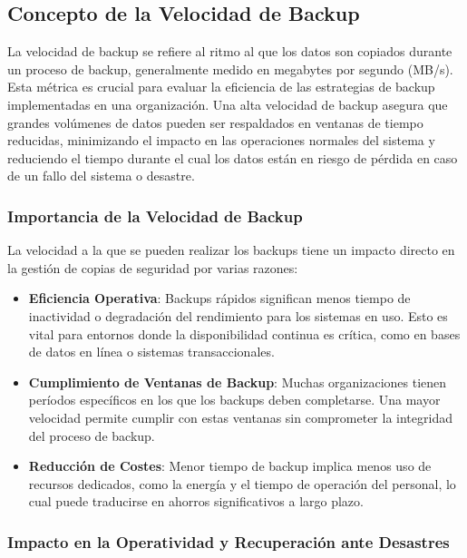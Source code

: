 \subsection{Concepto de la Velocidad de Backup}

La velocidad de backup se refiere al ritmo al que los datos son copiados durante un proceso de backup, generalmente medido en megabytes por segundo (MB/s). Esta métrica es crucial para evaluar la eficiencia de las estrategias de backup implementadas en una organización. Una alta velocidad de backup asegura que grandes volúmenes de datos pueden ser respaldados en ventanas de tiempo reducidas, minimizando el impacto en las operaciones normales del sistema y reduciendo el tiempo durante el cual los datos están en riesgo de pérdida en caso de un fallo del sistema o desastre.

\subsubsection{Importancia de la Velocidad de Backup}

La velocidad a la que se pueden realizar los backups tiene un impacto directo en la gestión de copias de seguridad por varias razones:
\begin{itemize}
    \item \textbf{Eficiencia Operativa}: Backups rápidos significan menos tiempo de inactividad o degradación del rendimiento para los sistemas en uso. Esto es vital para entornos donde la disponibilidad continua es crítica, como en bases de datos en línea o sistemas transaccionales.
    \item \textbf{Cumplimiento de Ventanas de Backup}: Muchas organizaciones tienen períodos específicos en los que los backups deben completarse. Una mayor velocidad permite cumplir con estas ventanas sin comprometer la integridad del proceso de backup.
    \item \textbf{Reducción de Costes}: Menor tiempo de backup implica menos uso de recursos dedicados, como la energía y el tiempo de operación del personal, lo cual puede traducirse en ahorros significativos a largo plazo.
\end{itemize}

\subsubsection{Impacto en la Operatividad y Recuperación ante Desastres}

